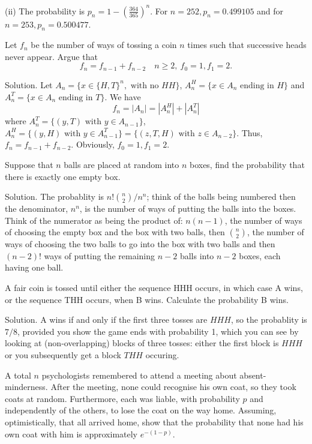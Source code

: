 (ii) The probability is $p_n=1-\left(\frac{364}{365}\right)^n$. For $n=252, p_n=0.499105$ and for $n=253,p_n=0.500477$.


\item Let $f_n$ be the number of ways of tossing a coin $n$ times such that successive heads never appear. Argue that 
\begin{equation}
f_n=f_{n-1}+f_{n-2}\quad n\geq 2, \ f_0=1,f_1=2.
\end{equation}



Solution. Let $A_n=\{x\in\{H,T\}^n,\text{ with no }HH\}$, $A_n^H=\{x\in A_n \text{ ending in }H\}$ and $A_n^T=\{x\in A_n \text{ ending in }T\}$. We have
\begin{equation}
f_n=|A_n| = |A_n^H| + |A_n^T|
\end{equation}
where $A_n^T=\{(y,T) \text{ with }y\in A_{n-1}\}$, $A_n^H = \{(y,H) \text{ with }y\in A_{n-1}^T\}=\{(z,T,H) \text{ with }z\in A_{n-2}\}$. Thus, $f_n=f_{n-1}+f_{n-2}$. Obviously, $f_0=1,f_1=2$.


\item Suppose that $n$ balls are placed at random into $n$ boxes, find the probability that there is exactly one empty box. 



Solution. The probablity is $n!\binom{n}{2}/n^n$; think of the balls being numbered then the denominator, $n^n$, is the number of ways of putting the balls into the boxes. Think of the numerator as being the product of: $n(n-1)$, the number of ways of choosing the empty box and the box with two balls, then $\binom{n}{2}$, the number of ways of choosing the two balls to go into the box with two balls and then $(n-2)!$ ways of putting the remaining $n-2$ balls into $n-2$ boxes, each having one ball.


\item A fair coin is tossed until either the sequence HHH occurs, in which case A wins, or the sequence THH occurs, when B wins. Calculate the probability B wins.



Solution. A wins if and only if the first three tosses are $HHH$, so the probablity is $7/8$, provided you show the game ends with probability 1, which you can see by looking at (non-overlapping) blocks of three tosses: either the first block is $HHH$ or you subsequently get a block $THH$ occuring.




\item A total $n$ psychologists remembered to attend a meeting about absent-minderness. After the meeting, none could recognise his own coat, so they took coats at random. Furthermore, each was liable, with probability $p$ and independently of the others, to lose the coat on the way home. Assuming, optimistically, that all arrived home, show that the probability that none had his own coat with him is approximately $e^{-(1-p)}$.




